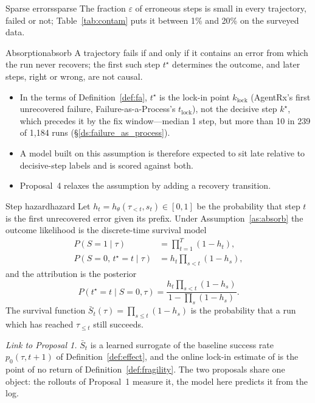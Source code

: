 \documentclass[10pt,a4paper]{article}
\begin{document}
\begin{assumption}{Sparse errors}{sparse}
The fraction $\varepsilon$ of erroneous steps is small in every trajectory, failed or not; Table~\ref{tab:contam} puts it between 1\% and 20\% on the surveyed data.
\end{assumption}

\begin{assumption}{Absorption}{absorb}
A trajectory fails if and only if it contains an error from which the run never recovers; the first such step $t^\star$ determines the outcome, and later steps, right or wrong, are not causal.
\begin{itemize}[leftmargin=1.1em]
\item In the terms of Definition~\ref{def:fa}, $t^\star$ is the lock-in point $k_{\mathrm{lock}}$ (AgentRx's first unrecovered failure, Failure-as-a-Process's $t_{\mathrm{lock}}$), not the decisive step $k^\star$, which precedes it by the fix window---median 1 step, but more than 10 in 239 of 1,184 runs (\S\ref{ds:failure_as_process}).
\item A model built on this assumption is therefore expected to sit late relative to decisive-step labels and is scored against both.
\item Proposal~4 relaxes the assumption by adding a recovery transition.
\end{itemize}
\end{assumption}

\begin{definition}{Step hazard}{hazard}
Let $h_t=h_\theta(\tau_{<t},s_t)\in[0,1]$ be the probability that step $t$ is the first unrecovered error given its prefix. Under Assumption~\ref{as:absorb} the outcome likelihood is the discrete-time survival model
\begin{align*}
P(S{=}1\mid\tau)&=\textstyle\prod_{t=1}^{T}(1-h_t),\\
P(S{=}0,\,t^\star{=}t\mid\tau)&=h_t\textstyle\prod_{s<t}(1-h_s),
\end{align*}
and the attribution is the posterior
\[P(t^\star{=}t\mid S{=}0,\tau)=\frac{h_t\prod_{s<t}(1-h_s)}{1-\prod_{s}(1-h_s)}.\]
The survival function $\bar S_t(\tau)=\prod_{s\le t}(1-h_s)$ is the probability that a run which has reached $\tau_{\le t}$ still succeeds.
\end{definition}

\emph{Link to Proposal 1.} $\bar S_t$ is a learned surrogate of the baseline success rate $p_0(\tau,t{+}1)$ of Definition~\ref{def:effect}, and the online lock-in estimate of  is the point of no return of Definition~\ref{def:fragility}. The two proposals share one object: the rollouts of Proposal~1 measure it, the model here predicts it from the log.
\end{document}

